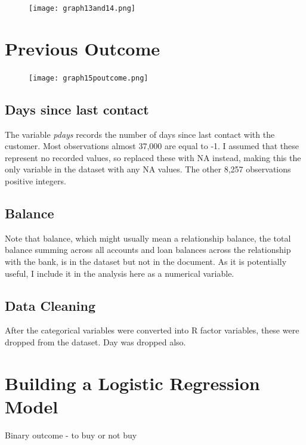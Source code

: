 \documentclass[9pt,technote]{IEEEtran}
\begin{document}
\begin{figure}[htbp]
\centerline{\texttt{[image: graph13and14.png]}}
\label{fig:graph13and14}
\end{figure}

\section{Previous Outcome}

\begin{figure}[htbp]
\centerline{\texttt{[image: graph15poutcome.png]}}
\label{fig:graph15poutcome}
\end{figure}

\subsection{Days since last contact}

The variable \textit{pdays} records the number of days since last contact with the customer.  Most observations almost 37,000 are equal to -1.  I assumed that these represent no recorded values, so replaced these with NA instead, making this the only variable in the dataset with any NA values.  The other 8,257 observations positive integers.

\subsection{Balance}
Note that balance, which might usually mean a relationship balance, the total balance summing across all accounts and loan balances across the relationship with the bank, is in the dataset but not in the document.  As it is potentially useful, I include it in the analysis here as a numerical variable.  


\subsection{Data Cleaning}

After the categorical variables were converted into R factor variables, these were dropped from the dataset.  Day was dropped also.  

\section{Building a Logistic Regression Model}

Binary outcome - to buy or not buy
\end{document}

